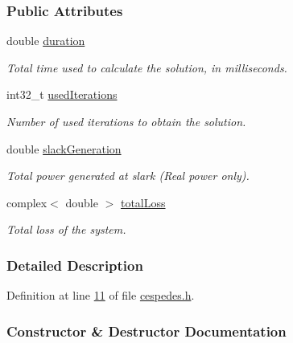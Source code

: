 \subsubsection*{Public Attributes}
\begin{DoxyCompactItemize}
\item 
double \hyperlink{class_cespedes_a815e35adbc446c937d164186a634b5a0}{duration}
\begin{DoxyCompactList}\small\item\em Total time used to calculate the solution, in milliseconds. \end{DoxyCompactList}\item 
int32\+\_\+t \hyperlink{class_cespedes_a28bead7e9c77462986e1471c50294d9e}{used\+Iterations}
\begin{DoxyCompactList}\small\item\em Number of used iterations to obtain the solution. \end{DoxyCompactList}\item 
double \hyperlink{class_cespedes_a74591c697b8b471f6c0450a561d30591}{slack\+Generation}
\begin{DoxyCompactList}\small\item\em Total power generated at slark (Real power only). \end{DoxyCompactList}\item 
complex$<$ double $>$ \hyperlink{class_cespedes_ae1a95c3c22fff9c230fd528d9b191966}{total\+Loss}
\begin{DoxyCompactList}\small\item\em Total loss of the system. \end{DoxyCompactList}\end{DoxyCompactItemize}


\subsubsection{Detailed Description}


Definition at line \hyperlink{cespedes_8h_source_l00011}{11} of file \hyperlink{cespedes_8h_source}{cespedes.\+h}.



\subsubsection{Constructor \& Destructor Documentation}
\hypertarget{class_cespedes_ad0b43c0c5ea7935c8dcb4dcf3d79ff7c}{}
